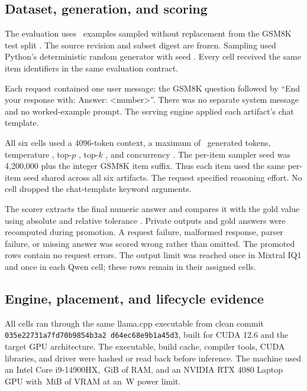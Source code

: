 \documentclass[11pt]{article}
\newcommand{\q}[1]{\texttt{#1}}
\begin{document}
\subsection{Dataset, generation, and scoring}

The evaluation uses \PfourPrimaryItemCount\ examples sampled without
replacement from the GSM8K test split \citep{cobbe2021gsm8k}. The source
revision and subset digest are frozen. Sampling used Python's deterministic
random generator with seed \PfourDatasetSamplingSeed. Every cell received the
same item identifiers in the same evaluation contract.

Each request contained one user message: the GSM8K question followed by
``End your response with: Answer: <number>''. There was no separate system
message and no worked-example prompt. The serving engine applied each
artifact's chat template.

All six cells used a 4096-token context, a maximum of
\PfourPrimaryMaxTokens\ generated tokens, temperature \PfourTemperature,
top-$p$ \PfourTopP, top-$k$ \PfourTopK, and concurrency
\PfourConcurrency. The per-item sampler seed was 4,200,000 plus the integer
GSM8K item suffix. Thus each item used the same per-item seed shared across
all six artifacts. The request specified \q{\PfourReasoningEffort} reasoning
effort. No cell dropped the chat-template keyword arguments.

The scorer extracts the final numeric answer and compares it with the gold
value using absolute and relative tolerance
\PfourGsmScorerTolerance. Private outputs and gold answers were recomputed
during promotion. A request failure, malformed response, parser failure, or
missing answer was scored wrong rather than omitted. The promoted rows contain
no request errors. The output limit was reached once in Mixtral IQ1 and once
in each Qwen cell; these rows remain in their assigned cells.

\subsection{Engine, placement, and lifecycle evidence}

All cells ran through the same llama.cpp executable from clean commit
\texttt{035e2273\allowbreak 1a7fd70b\allowbreak 9854b3a2\allowbreak
d64ec68e\allowbreak 9b1a45d3}, built for CUDA 12.6 and the
target GPU architecture. The executable, build cache, compiler tools, CUDA
libraries, and driver were hashed or read back before inference. The machine
used an Intel Core i9-14900HX, \PfourRamGib\,GiB of RAM, and an NVIDIA RTX
4080 Laptop GPU with \PfourGpuVramMib\,MiB of VRAM at an
\PfourGpuPowerW\,W power limit.
\end{document}
